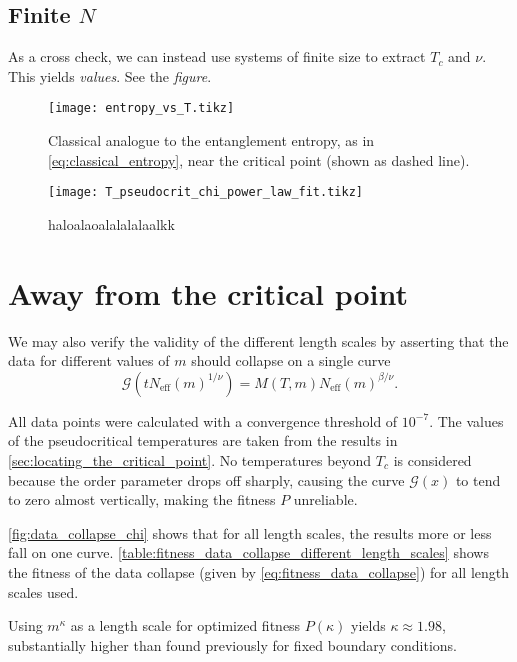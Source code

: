 \subsection{Finite $N$}
As a cross check, we can instead use systems of finite size to extract $T_c$ and $\nu$.
This yields \emph{values}. See the \emph{figure}.

\begin{figure}
  \texttt{[image: entropy\_vs\_T.tikz]}
  \caption{Classical analogue to the entanglement entropy, as in \autoref{eq:classical_entropy},
  near the critical point (shown as dashed line).}\label{fig:entropy_vs_T}
\end{figure}

\begin{figure}
  \texttt{[image: T\_pseudocrit\_chi\_power\_law\_fit.tikz]}
  \caption{haloalaoalalalalaalkk}\label{fig:T_pseudocrit_chi_power_law_fit}
\end{figure}

\section{Away from the critical point}

We may also verify the validity of the different length scales by asserting that the data for different values of $m$
should collapse on a single curve
\begin{equation}
  \mathcal{G}(t N_{\text{eff}}(m)^{1/\nu}) = M(T, m) N_{\text{eff}}(m)^{\beta/\nu}.
\end{equation}

All data points were calculated with a convergence threshold of $10^{-7}$.
The values of the pseudocritical temperatures are taken from the results in \autoref{sec:locating_the_critical_point}.
No temperatures beyond $T_c$ is considered because the order parameter drops off sharply,
causing the curve $\mathcal{G}(x)$ to tend to zero almost vertically, making the fitness $P$ unreliable.

\autoref{fig:data_collapse_chi} shows that for all length scales, the results more or less fall on one curve.
\autoref{table:fitness_data_collapse_different_length_scales} shows the fitness of the data collapse
\cite{bhattacharjee2001measure} (given by \autoref{eq:fitness_data_collapse}) for all length scales used.


Using $m^{\kappa}$ as a length scale for optimized fitness $P(\kappa)$ yields $\kappa \approx 1.98$,
substantially higher than found previously for fixed boundary conditions.

